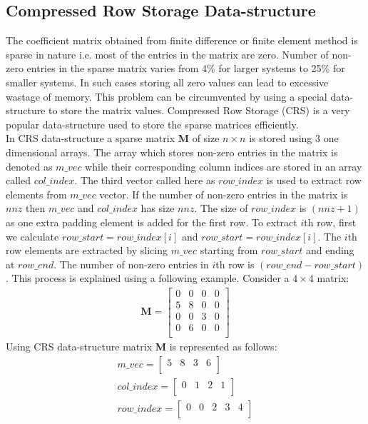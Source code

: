 \documentclass[sigplan,screen]{acmart}
\begin{document}
\subsection{Compressed Row Storage Data-structure}\label{crs}
The coefficient matrix obtained from finite difference or finite element method is sparse in nature i.e. most of the entries in the matrix are zero. Number of non-zero entries in the sparse matrix varies from 4\% for larger systems to 25\% for smaller systems. In such cases storing all zero values can lead to excessive wastage of memory. This problem can be circumvented by using a special data-structure to store the matrix values. Compressed Row Storage (CRS) \cite{sparse} is a very popular data-structure used to store the sparse matrices efficiently. \\
In CRS data-structure a sparse matrix \textbf{M} of size $n\times n$ is stored using 3 one dimensional arrays. The array which stores non-zero entries in the matrix is denoted as $m\_vec$ while their corresponding column indices are stored in an array called $col\_index$. The third vector called here as $row\_index$ is used to extract row elements from $m\_vec$ vector. If the number of non-zero entries in the matrix is $nnz$ then $m\_vec$ and $col\_index$ has size $nnz$. The size of $row\_index$ is $(nnz+1)$ as one extra padding element is added for the first row. To extract $i$th row, first we calculate $row\_start=row\_index[i]$ and $row\_start=row\_index[i]$. The $i$th row elements are extracted by slicing $m\_vec$ starting from $row\_start$ and ending at $row\_end$. The number of non-zero entries in $i$th row is $(row\_end - row\_start)$. This process is explained using a following example. Consider a $4\times 4$ matrix:
\begin{align*}
\textbf{M} =
\begin{bmatrix}
0 & 0 & 0 & 0\\
5 & 8 & 0 & 0\\
0 & 0 & 3 & 0\\
0 & 6 & 0 & 0\\
\end{bmatrix}
\end{align*}
Using CRS data-structure matrix \textbf{M} is represented as follows:
\begin{align*}
m\_vec =
\begin{bmatrix}
5 & 8 & 3 & 6\\
\end{bmatrix}   \\
col\_index =
\begin{bmatrix}
0 & 1 & 2 & 1\\
\end{bmatrix}\\   
row\_index =
\begin{bmatrix}
0 & 0 & 2 & 3 & 4\\
\end{bmatrix}   
\end{align*}
\end{document}
